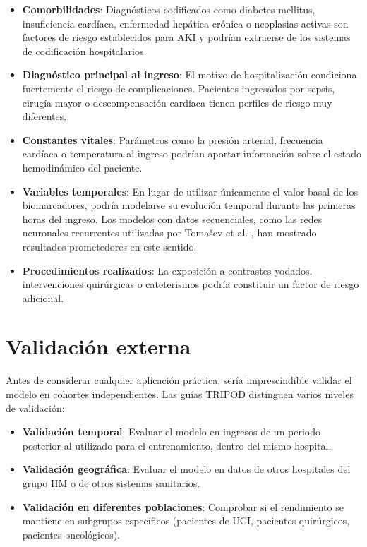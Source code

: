 \documentclass[12pt, a4paper, oneside]{report}
\begin{document}
\begin{itemize}
    \item \textbf{Comorbilidades}: Diagnósticos codificados como diabetes mellitus, insuficiencia cardíaca, enfermedad hepática crónica o neoplasias activas son factores de riesgo establecidos para AKI \cite{kellum2021acute} y podrían extraerse de los sistemas de codificación hospitalarios.
    
    \item \textbf{Diagnóstico principal al ingreso}: El motivo de hospitalización condiciona fuertemente el riesgo de complicaciones. Pacientes ingresados por sepsis, cirugía mayor o descompensación cardíaca tienen perfiles de riesgo muy diferentes.
    
    \item \textbf{Constantes vitales}: Parámetros como la presión arterial, frecuencia cardíaca o temperatura al ingreso podrían aportar información sobre el estado hemodinámico del paciente.
    
    \item \textbf{Variables temporales}: En lugar de utilizar únicamente el valor basal de los biomarcadores, podría modelarse su evolución temporal durante las primeras horas del ingreso. Los modelos con datos secuenciales, como las redes neuronales recurrentes utilizadas por Tomašev et al. \cite{tomasev2019nature}, han mostrado resultados prometedores en este sentido.
    
    \item \textbf{Procedimientos realizados}: La exposición a contrastes yodados, intervenciones quirúrgicas o cateterismos podría constituir un factor de riesgo adicional.
\end{itemize}

\section{Validación externa}

Antes de considerar cualquier aplicación práctica, sería imprescindible validar el modelo en cohortes independientes. Las guías TRIPOD \cite{collins2015tripod} distinguen varios niveles de validación:

\begin{itemize}
    \item \textbf{Validación temporal}: Evaluar el modelo en ingresos de un periodo posterior al utilizado para el entrenamiento, dentro del mismo hospital.
    
    \item \textbf{Validación geográfica}: Evaluar el modelo en datos de otros hospitales del grupo HM o de otros sistemas sanitarios.
    
    \item \textbf{Validación en diferentes poblaciones}: Comprobar si el rendimiento se mantiene en subgrupos específicos (pacientes de UCI, pacientes quirúrgicos, pacientes oncológicos).
\end{itemize}
\end{document}
